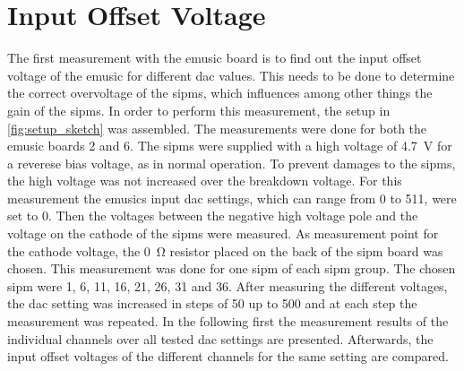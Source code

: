 




\section{Input Offset Voltage}
The first measurement with the \ac{emusic} board is to find out the input offset voltage of the \ac{emusic} for different \ac{dac} values.
This needs to be done to determine the correct overvoltage of the \acp{sipm}, which influences among other things the gain of the \acp{sipm}.
In order to perform this measurement, the setup in \autoref{fig:setup_sketch} was assembled.
The measurements were done for both the \ac{emusic} boards 2 and 6.
The \acp{sipm} were supplied with a high voltage of \SI{4.7}{\volt} for a reverese bias voltage, as in normal operation.
To prevent damages to the \acp{sipm}, the high voltage was not increased over the breakdown voltage.
For this measurement the \ac{emusic}s input \ac{dac} settings, which can range from 0 to \SI{511}{\dacu}, were set to \SI{0}{\dacu}.
Then the voltages between the negative high voltage pole and the voltage on the cathode of the \acp{sipm} were measured.
As measurement point for the cathode voltage, the \SI{0}{\ohm} resistor placed on the back of the \ac{sipm} board was chosen.
This measurement was done for one \ac{sipm} of each \ac{sipm} group.
The chosen \ac{sipm} were 1, 6, 11, 16, 21, 26, 31 and 36.
After measuring the different voltages, the \ac{dac} setting was increased in steps of \SI{50}{\dacu} up to \SI{500}{\dacu} and at each step the measurement was repeated.
In the following first the measurement results of the individual channels over all tested \ac{dac} settings are presented.
Afterwards, the input offset voltages of the different channels for the same setting are compared.

